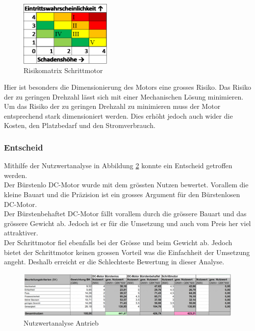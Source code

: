 \documentclass[../../../main.tex]{subfiles}
\begin{document}
    \begin{figure}[H]
        \centering
        \includegraphics[width=0.4\textwidth]{Antr_Risiko_Schrittmotor.png}
        \caption {Risikomatrix Schrittmotor}
        \label{fig:antr_risikomatrix_schrittmotor}
    \end{figure}

    Hier ist besonders die Dimensionierung des Motors eine grosses Risiko. Das Risiko der zu geringen Drehzahl lässt sich mit einer Mechanischen Lösung  minimieren. Um das Risiko der zu geringen Drehzahl zu minimieren muss der Motor entsprechend stark dimensioniert werden. Dies erhöht jedoch auch wider die Kosten, den Platzbedarf und den Stromverbrauch.

    \subsubsection{Entscheid}
    Mithilfe der Nutzwertanalyse in Abbildung \ref{fig:antr_nutzwertanalyse} konnte ein Entscheid getroffen werden.\\
    Der Bürstenlo DC-Motor wurde mit dem grössten Nutzen bewertet. Vorallem die kleine Bauart und die Präzision ist ein grosses Argument für den Bürstenlosen DC-Motor.\\
    Der Bürstenbehaftet DC-Motor fällt vorallem durch die grössere Bauart und das grössere Gewicht ab. Jedoch ist er für die Umsetzung und auch vom Preis her viel attraktiver.\\
    Der Schrittmotor fiel ebenfalls bei der Grösse und beim Gewicht ab. Jedoch bietet der Schrittmotor keinen grossen Vorteil was die Einfachheit der Umsetzung angeht. Deshalb erreicht er die Schlechteste Bewertung in dieser Analyse.\\
        
    \begin{figure}[H]
        \centering
        \includegraphics[width=1.0\textwidth]{Antr_Nutzwertanalyse.png}
        \caption {Nutzwertanalyse Antrieb}
        \label{fig:antr_nutzwertanalyse}
    \end{figure}
\end{document}
